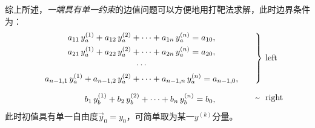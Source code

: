 \documentclass[preview,10pt,border=8pt]{standalone}
\begin{document}
	综上所述，\textit{一端具有单一约束}的边值问题可以方便地用打靶法求解，此时边界条件为：
	\begin{align}
	\left.
	\begin{gathered}
		a_{11}\, y^{(1)}_a + a_{12}\, y^{(2)}_a + \cdots + a_{1n}\, y^{(n)}_a = a_{10}, \\
		a_{21}\, y^{(1)}_a + a_{22}\, y^{(2)}_a + \cdots + a_{2n}\, y^{(n)}_a = a_{20}, \\
		\cdots\\
		a_{n-1,1}\, y^{(1)}_a + a_{n-1,2}\, y^{(2)}_a + \cdots + a_{n-1,n}\, y^{(n)}_a = a_{n-1,0}, 
	\end{gathered}\qquad
	\right\rbrace&\mathrlap{\ \tup{left}}\\[1ex]
	\begin{gathered}
		\phantom{
		a_{n-1,1}\, y^{(1)}_a + a_{n-1,2}\, y^{(2)}_a + \cdots + a_{n-1,n}\, y^{(n)}_a = a_{n-1,0}, 
		}\\[-\baselineskip]
		b_{1}\, y^{(1)}_b + b_{2}\, y^{(2)}_b + \cdots + b_{n}\, y^{(n)}_b = b_{0},
	\end{gathered}\quad
	\tup{\textasciitilde}\ &\mathrlap{\ \tup{right}}
	\end{align}
	此时初值具有单一自由度$\vec{y}_0 = y_0$，可简单取为某一$y^{(k)}$分量。
\end{document}
